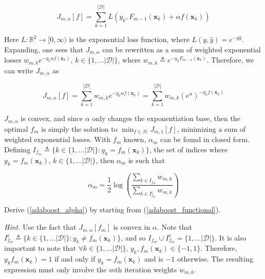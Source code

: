\documentclass{article}
\numberwithin{equation}{section}
\begin{document}
\begin{enumerate}
    \begin{equation*}
        J_{m, \alpha}[f] = \sum_{k = 1}^{|\mathcal{D}|}
        L(y_k, F_{m - 1}(\mathbf{x}_k) + \alpha f(\mathbf{x}_k))
    \end{equation*}

    Here $ L : \mathbb{R}^2 \rightarrow [0, \infty) $ is the exponential loss
    function, where $ L(y, \hat{y}) = e^{-y\hat{y}} $. Expanding, one sees that
    $ J_{m ,\alpha} $ can be rewritten as a sum of weighted exponential
    losses $ w_{m, k}e^{-y_k\alpha f(\mathbf{x}_k)} $,
    $ k \in \{1, \ldots |\mathcal{D}|\} $, where $ w_{m, k} \triangleq
    e^{-y_kF_{m - 1}(\mathbf{x}_k)} $. Therefore, we can write $ J_{m, \alpha} $
    as

    \begin{equation} \label{adaboost_functional}
        J_{m, \alpha}[f] = \sum_{k = 1}^{|\mathcal{D}|}w_{m, k}
        e^{-y_k\alpha f(\mathbf{x}_k)} =
        \sum_{k = 1}^{|\mathcal{D}|}w_{m, k}(e^\alpha)^{-y_kf(\mathbf{x}_k)}
    \end{equation}

    $ J_{m, \alpha} $ is convex, and since $ \alpha $ only changes the
    exponentiation base, then the optimal $ f_m $ is simply the solution to
    $ \min_{f \in \mathcal{H}}J_{m, 1}[f] $, minimizing a sum of weighted
    exponential losses. With $ f_m $ known, $ \alpha_m $ can be found in closed
    form. Defining
    $ I_{f_m} \triangleq \{k \in \{1, \ldots |\mathcal{D}|\} :
    y_k = f_m(\mathbf{x}_k)\} $, the set of indices where
    $ y_k = f_m(\mathbf{x}_k) $, $ k \in \{1, \ldots |\mathcal{D}|\} $, then
    $ \alpha_m $ is such that

    \begin{equation} \label{adaboost_alpha}
        \alpha_m = \frac{1}{2}\log\left(
            \frac{\sum_{k \in I_{f_m}}w_{m, k}}{
                \sum_{k \in I_{f_m}^\mathsf{c}}w_{m, k}
            }
        \right)
    \end{equation}

    Derive (\ref{adaboost_alpha}) by starting from (\ref{adaboost_functional}).

    \medskip

    \textit{Hint.} Use the fact that $ J_{m, \alpha}[f_m] $ is convex in
    $ \alpha $. Note that $ I_{f_m}^\mathsf{c} \triangleq
    \{k \in \{1, \ldots |\mathcal{D}|\} : y_k \ne f_m(\mathbf{x}_k)\} $, and so
    $ I_{f_m} \cup I_{f_m}^\mathsf{c} = \{1, \ldots |\mathcal{D}|\} $. It is
    also important to note that $ \forall k \in \{1, \ldots |\mathcal{D}|\} $,
    $ y_k, f_m(\mathbf{x}_k) \in \{-1, 1\} $. Therefore,
    $ y_kf_m(\mathbf{x}_k) = 1 $ if and only if $ y_k = f_m(\mathbf{x}_k) $ and
    is $ -1 $ otherwise. The resulting expression must only involve the $ m $th
    iteration weights $ w_{m, k} $.

\end{enumerate}
\end{document}
